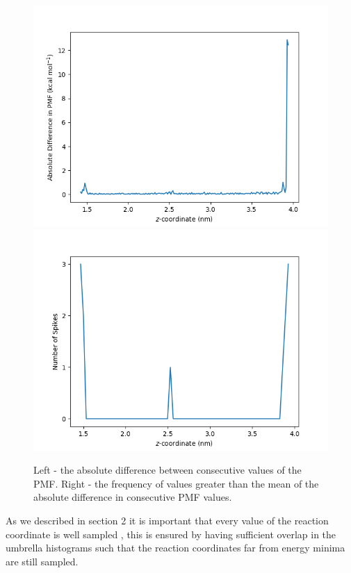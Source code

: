 \documentclass[12pt, onecolumn]{revtex4}    %
\begin{document}
\begin{figure}[h!]
\includegraphics[scale=0.4]{HelAbsDiffs}
\includegraphics[scale=0.4]{HelSpikeHist}
\label{fig: helSpikes}
\caption{Left - the absolute difference between consecutive values of the PMF.  Right - the frequency of values greater than the mean of the absolute difference in consecutive PMF values.}
\end{figure}
 
As we described in section 2 it is important that every value of the reaction coordinate is well sampled \cite{Umbrella}, this is ensured by having sufficient overlap \cite{GWHAM} in the umbrella histograms such that the reaction coordinates far from energy minima are still sampled.\\
\end{document}
